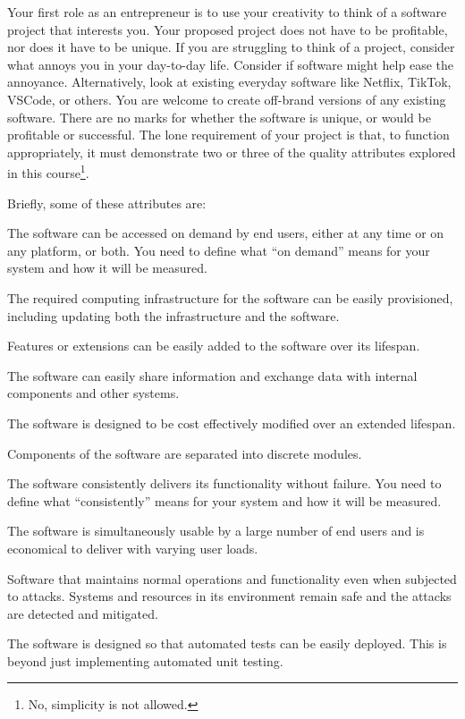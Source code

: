 \documentclass{csse4400}
\begin{document}
Your first role as an entrepreneur is to use your creativity to think of a software project that interests you.
Your proposed project does not have to be profitable, nor does it have to be unique.
If you are struggling to think of a project, consider what annoys you in your day-to-day life.
Consider if software might help ease the annoyance.
Alternatively, look at existing everyday software like Netflix, TikTok, VSCode, or others.
You are welcome to create off-brand versions of any existing software.
There are no marks for whether the software is unique, or would be profitable or successful.
The lone requirement of your project is that, to function appropriately, it must demonstrate two or three of the quality attributes 
explored in this course\footnote{No, simplicity is not allowed.}.

\newpage\noindent
Briefly, some of these attributes are:
\begin{description}[topsep=7pt,partopsep=2pt,itemsep=4pt,parsep=4pt]
    \item[Availability] The software can be accessed on demand by end users, either at any time or on any platform, or both.
                        You need to define what ``on demand'' means for your system and how it will be measured.
    \item[Deployability] The required computing infrastructure for the software can be easily provisioned, including updating both the infrastructure and the software.
    \item[Extensibility] Features or extensions can be easily added to the software over its lifespan.
    \item[Interoperability] The software can easily share information and exchange data with internal components and other systems.
    \item[Maintainability] The software is designed to be cost effectively modified over an extended lifespan.
    \item[Modularity] Components of the software are separated into discrete modules.
    \item[Reliability] The software consistently delivers its functionality without failure. You need to define what ``consistently'' means for your system and how it will be measured.
    \item[Scalability] The software is simultaneously usable by a large number of end users and is economical to deliver with varying user loads.
    \item[Security] Software that maintains normal operations and functionality even when subjected to attacks.
                    Systems and resources in its environment remain safe and the attacks are detected and mitigated.
    \item[Testibility] The software is designed so that automated tests can be easily deployed.
                       This is beyond just implementing automated unit testing.
\end{description}
\end{document}
